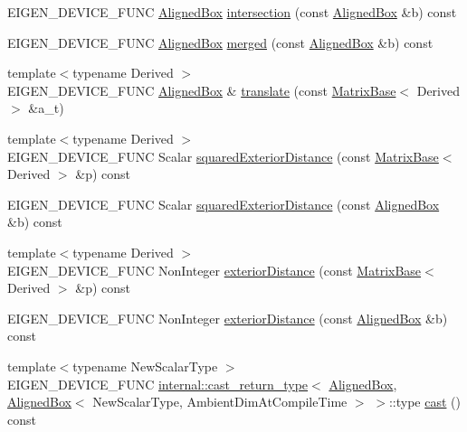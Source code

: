 \begin{DoxyCompactItemize}
\item 
E\+I\+G\+E\+N\+\_\+\+D\+E\+V\+I\+C\+E\+\_\+\+F\+U\+NC \mbox{\hyperlink{class_eigen_1_1_aligned_box}{Aligned\+Box}} \mbox{\hyperlink{class_eigen_1_1_aligned_box_ac31024e7fccb025810535eb5a673ed14}{intersection}} (const \mbox{\hyperlink{class_eigen_1_1_aligned_box}{Aligned\+Box}} \&b) const
\item 
E\+I\+G\+E\+N\+\_\+\+D\+E\+V\+I\+C\+E\+\_\+\+F\+U\+NC \mbox{\hyperlink{class_eigen_1_1_aligned_box}{Aligned\+Box}} \mbox{\hyperlink{class_eigen_1_1_aligned_box_a8182b7661c4b244285ca0f831363b00a}{merged}} (const \mbox{\hyperlink{class_eigen_1_1_aligned_box}{Aligned\+Box}} \&b) const
\item 
{\footnotesize template$<$typename Derived $>$ }\\E\+I\+G\+E\+N\+\_\+\+D\+E\+V\+I\+C\+E\+\_\+\+F\+U\+NC \mbox{\hyperlink{class_eigen_1_1_aligned_box}{Aligned\+Box}} \& \mbox{\hyperlink{class_eigen_1_1_aligned_box_af869911480769d718514cd008dd191dc}{translate}} (const \mbox{\hyperlink{class_eigen_1_1_matrix_base}{Matrix\+Base}}$<$ Derived $>$ \&a\+\_\+t)
\item 
{\footnotesize template$<$typename Derived $>$ }\\E\+I\+G\+E\+N\+\_\+\+D\+E\+V\+I\+C\+E\+\_\+\+F\+U\+NC Scalar \mbox{\hyperlink{class_eigen_1_1_aligned_box_aa6d9ffc81bd77da631fef6559f45cf13}{squared\+Exterior\+Distance}} (const \mbox{\hyperlink{class_eigen_1_1_matrix_base}{Matrix\+Base}}$<$ Derived $>$ \&p) const
\item 
E\+I\+G\+E\+N\+\_\+\+D\+E\+V\+I\+C\+E\+\_\+\+F\+U\+NC Scalar \mbox{\hyperlink{class_eigen_1_1_aligned_box_ae9a0ba701f64f431ccfa63e79062a901}{squared\+Exterior\+Distance}} (const \mbox{\hyperlink{class_eigen_1_1_aligned_box}{Aligned\+Box}} \&b) const
\item 
{\footnotesize template$<$typename Derived $>$ }\\E\+I\+G\+E\+N\+\_\+\+D\+E\+V\+I\+C\+E\+\_\+\+F\+U\+NC Non\+Integer \mbox{\hyperlink{class_eigen_1_1_aligned_box_afe02b2ef5cdc1e1cd45eddee33cf1be5}{exterior\+Distance}} (const \mbox{\hyperlink{class_eigen_1_1_matrix_base}{Matrix\+Base}}$<$ Derived $>$ \&p) const
\item 
E\+I\+G\+E\+N\+\_\+\+D\+E\+V\+I\+C\+E\+\_\+\+F\+U\+NC Non\+Integer \mbox{\hyperlink{class_eigen_1_1_aligned_box_adf8c0e000b283ad22f00474356916686}{exterior\+Distance}} (const \mbox{\hyperlink{class_eigen_1_1_aligned_box}{Aligned\+Box}} \&b) const
\item 
{\footnotesize template$<$typename New\+Scalar\+Type $>$ }\\E\+I\+G\+E\+N\+\_\+\+D\+E\+V\+I\+C\+E\+\_\+\+F\+U\+NC \mbox{\hyperlink{struct_eigen_1_1internal_1_1cast__return__type}{internal\+::cast\+\_\+return\+\_\+type}}$<$ \mbox{\hyperlink{class_eigen_1_1_aligned_box}{Aligned\+Box}}, \mbox{\hyperlink{class_eigen_1_1_aligned_box}{Aligned\+Box}}$<$ New\+Scalar\+Type, Ambient\+Dim\+At\+Compile\+Time $>$ $>$\+::type \mbox{\hyperlink{class_eigen_1_1_aligned_box_a269eb719d3e093d9c1cb4309b815c51b}{cast}} () const

\end{DoxyCompactItemize}
